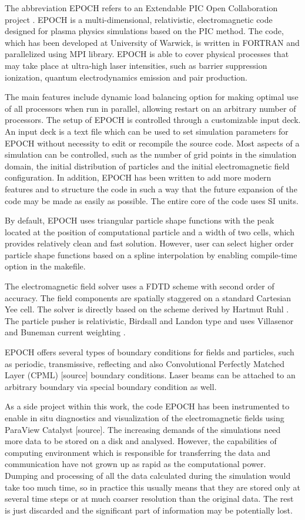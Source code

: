 The abbreviation EPOCH refers to an Extendable PIC Open Collaboration project \cite{bennett}. EPOCH is a multi-dimensional, relativistic, electromagnetic code designed for plasma physics simulations based on the PIC method. The code, which has been developed at University of Warwick, is written in FORTRAN and parallelized using MPI library. EPOCH is able to cover physical processes that may take place at ultra-high laser intensities, such as barrier suppression ionization, quantum electrodynamics emission and pair production.

The main features include dynamic load balancing option for making optimal use of all processors when run in parallel, allowing restart on an arbitrary number of processors. The setup of EPOCH is controlled through a customizable input deck. An input deck is a text file which can be used to set simulation parameters for EPOCH without necessity to edit or recompile the source code. Most aspects of a simulation can be controlled, such as the number of grid points in the simulation domain, the initial distribution of particles and the initial electromagnetic field configuration. In addition, EPOCH has been written to add more modern features and to structure the code in such a way that the future expansion of the code may be made as easily as possible. The entire core of the code uses SI units.

By default, EPOCH uses triangular particle shape functions with the peak located at the position of computational particle and a width of two cells, which provides relatively clean and fast solution. However, user can select higher order particle shape functions based on a spline interpolation by enabling compile-time option in the makefile.

The electromagnetic field solver uses a FDTD scheme with second order of accuracy. The field components are spatially staggered on a standard Cartesian Yee cell. The solver is directly based on the scheme derived by Hartmut Ruhl \cite{ruhl}. The particle pusher is relativistic, Birdsall and Landon type \cite{birdsall} and uses Villasenor and Buneman current weighting \cite{villasenor}.

EPOCH offers several types of boundary conditions for fields and particles, such as periodic, transmissive, reflecting and also Convolutional Perfectly Matched Layer (CPML) [source] boundary conditions. Laser beams can be attached to an arbitrary boundary via special boundary condition as well.

As a side project within this work, the code EPOCH has been instrumented to enable in situ diagnostics and visualization of the electromagnetic fields using ParaView Catalyst [source].
The increasing demands of the simulations need more data to be stored on a disk and analysed. However, the capabilities of computing environment which is responsible for transferring the data and communication have not grown up as rapid as the computational power. Dumping and processing of all the data calculated during the simulation would take too much time, so in practice this usually means that they are stored only at several time steps or at much coarser resolution than the original data. The rest is just discarded and the significant part of information may be potentially lost.

